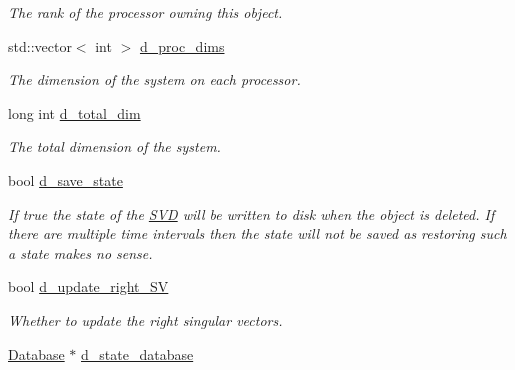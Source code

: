 \begin{DoxyCompactItemize}
\begin{DoxyCompactList}\small\item\em The rank of the processor owning this object. \end{DoxyCompactList}\item 
\hypertarget{class_c_a_r_o_m_1_1_incremental_s_v_d_a18cefa3fd722cf27bbad6a1b02cb4d5d}{std\-::vector$<$ int $>$ \hyperlink{class_c_a_r_o_m_1_1_incremental_s_v_d_a18cefa3fd722cf27bbad6a1b02cb4d5d}{d\-\_\-proc\-\_\-dims}}\label{class_c_a_r_o_m_1_1_incremental_s_v_d_a18cefa3fd722cf27bbad6a1b02cb4d5d}

\begin{DoxyCompactList}\small\item\em The dimension of the system on each processor. \end{DoxyCompactList}\item 
\hypertarget{class_c_a_r_o_m_1_1_incremental_s_v_d_a64075bb014d7acaca035254ca1b5f4e9}{long int \hyperlink{class_c_a_r_o_m_1_1_incremental_s_v_d_a64075bb014d7acaca035254ca1b5f4e9}{d\-\_\-total\-\_\-dim}}\label{class_c_a_r_o_m_1_1_incremental_s_v_d_a64075bb014d7acaca035254ca1b5f4e9}

\begin{DoxyCompactList}\small\item\em The total dimension of the system. \end{DoxyCompactList}\item 
\hypertarget{class_c_a_r_o_m_1_1_incremental_s_v_d_a0668be92dac1554ceef0eebda70cb512}{bool \hyperlink{class_c_a_r_o_m_1_1_incremental_s_v_d_a0668be92dac1554ceef0eebda70cb512}{d\-\_\-save\-\_\-state}}\label{class_c_a_r_o_m_1_1_incremental_s_v_d_a0668be92dac1554ceef0eebda70cb512}

\begin{DoxyCompactList}\small\item\em If true the state of the \hyperlink{class_c_a_r_o_m_1_1_s_v_d}{S\-V\-D} will be written to disk when the object is deleted. If there are multiple time intervals then the state will not be saved as restoring such a state makes no sense. \end{DoxyCompactList}\item 
\hypertarget{class_c_a_r_o_m_1_1_incremental_s_v_d_a3289b31326d526b985001bf617982e62}{bool \hyperlink{class_c_a_r_o_m_1_1_incremental_s_v_d_a3289b31326d526b985001bf617982e62}{d\-\_\-update\-\_\-right\-\_\-\-S\-V}}\label{class_c_a_r_o_m_1_1_incremental_s_v_d_a3289b31326d526b985001bf617982e62}

\begin{DoxyCompactList}\small\item\em Whether to update the right singular vectors. \end{DoxyCompactList}\item 
\hypertarget{class_c_a_r_o_m_1_1_incremental_s_v_d_a29d5353eb6d9076d162e7359aa85cb7a}{\hyperlink{class_c_a_r_o_m_1_1_database}{Database} $\ast$ \hyperlink{class_c_a_r_o_m_1_1_incremental_s_v_d_a29d5353eb6d9076d162e7359aa85cb7a}{d\-\_\-state\-\_\-database}}\label{class_c_a_r_o_m_1_1_incremental_s_v_d_a29d5353eb6d9076d162e7359aa85cb7a}


\end{DoxyCompactItemize}

